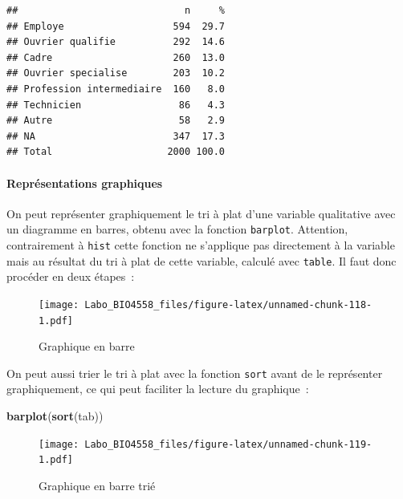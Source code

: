 \documentclass[12pt,]{book}
\newenvironment{Shaded}{\begin{snugshade}}{\end{snugshade}}
\newcommand{\KeywordTok}[1]{\textcolor[rgb]{0.13,0.29,0.53}{\textbf{#1}}}
\newcommand{\NormalTok}[1]{#1}
\newcommand{\OperatorTok}[1]{\textcolor[rgb]{0.81,0.36,0.00}{\textbf{#1}}}
\newcommand{\StringTok}[1]{\textcolor[rgb]{0.31,0.60,0.02}{#1}}
\let\oldparagraph\paragraph
\renewcommand{\paragraph}[1]{\oldparagraph{#1}\mbox{}}
\begin{document}
\begin{verbatim}
##                             n     %
## Employe                   594  29.7
## Ouvrier qualifie          292  14.6
## Cadre                     260  13.0
## Ouvrier specialise        203  10.2
## Profession intermediaire  160   8.0
## Technicien                 86   4.3
## Autre                      58   2.9
## NA                        347  17.3
## Total                    2000 100.0
\end{verbatim}

\hypertarget{repruxe9sentations-graphiques}{%
\paragraph{Représentations graphiques}\label{repruxe9sentations-graphiques}}

On peut représenter graphiquement le tri à plat d'une variable qualitative avec un diagramme en barres, obtenu avec la fonction \texttt{barplot}. Attention, contrairement à \texttt{hist} cette fonction ne s'applique pas directement à la variable mais au résultat du tri à plat de cette variable, calculé avec \texttt{table}. Il faut donc procéder en deux étapes~:

\begin{Shaded}
\end{Shaded}

\begin{figure}
\centering
\texttt{[image: Labo\_BIO4558\_files/figure-latex/unnamed-chunk-118-1.pdf]}
\caption{\label{fig:unnamed-chunk-118}Graphique en barre}
\end{figure}

On peut aussi trier le tri à plat avec la fonction \texttt{sort} avant de le représenter graphiquement, ce qui peut faciliter la lecture du graphique~:

\begin{Shaded}
\begin{Highlighting}[]
\KeywordTok{barplot}\NormalTok{(}\KeywordTok{sort}\NormalTok{(tab))}
\end{Highlighting}
\end{Shaded}

\begin{figure}
\centering
\texttt{[image: Labo\_BIO4558\_files/figure-latex/unnamed-chunk-119-1.pdf]}
\caption{\label{fig:unnamed-chunk-119}Graphique en barre trié}
\end{figure}
\end{document}
